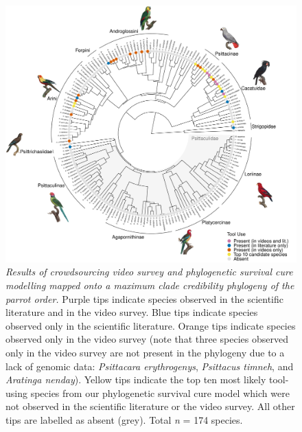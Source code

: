 \documentclass[
  man,floatsintext]{apa6}
\begin{document}
\begin{figure}
\centering
\includegraphics{manuscript_files/figure-latex/plotPhylo1-1.pdf}
\caption{\label{fig:plotPhylo1}\emph{Results of crowdsourcing video survey and phylogenetic survival cure modelling mapped onto a maximum clade credibility phylogeny of the parrot order.} Purple tips indicate species observed in the scientific literature and in the video survey. Blue tips indicate species observed only in the scientific literature. Orange tips indicate species observed only in the video survey (note that three species observed only in the video survey are not present in the phylogeny due to a lack of genomic data: \emph{Psittacara erythrogenys}, \emph{Psittacus timneh}, and \emph{Aratinga nenday}). Yellow tips indicate the top ten most likely tool-using species from our phylogenetic survival cure model which were not observed in the scientific literature or the video survey. All other tips are labelled as absent (grey). Total \emph{n} = 174 species.}
\end{figure}
\end{document}
